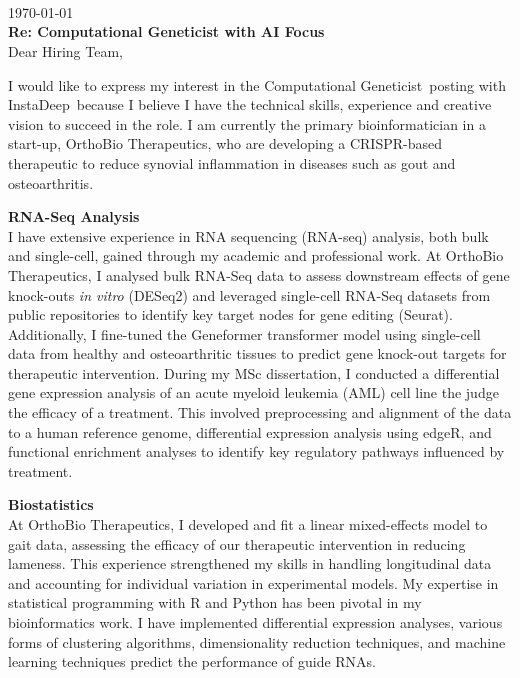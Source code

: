 \documentclass{resume}
\newcommand\JOB{Computational Geneticist with AI Focus
}
\newcommand\POSTING{Computational Geneticist}
\newcommand\COMPANY{InstaDeep}
\newcommand\EMPLOYER{Hiring Team}
\newcommand\REF{}
\begin{document}
\begin{rSection}{}
\leavevmode \\ \\ \\
\today \\
\REF
\textbf{Re: \JOB}  \\ 

Dear \EMPLOYER ,

I would like to express my interest in the \POSTING\ posting with \COMPANY\ because I believe I have the technical skills, experience and creative vision to succeed in the role. I am currently the primary bioinformatician in a start-up, OrthoBio Therapeutics, who are developing a CRISPR-based therapeutic to reduce synovial inflammation in diseases such as gout and osteoarthritis. 

\textbf{RNA-Seq Analysis} \\
I have extensive experience in RNA sequencing (RNA-seq) analysis, both bulk and single-cell, gained through my academic and professional work. At OrthoBio Therapeutics, I analysed bulk RNA-Seq data to assess downstream effects of gene knock-outs \textit{in vitro} (DESeq2) and leveraged single-cell RNA-Seq datasets from public repositories to identify key target nodes for gene editing (Seurat). Additionally, I fine-tuned the Geneformer transformer model using single-cell data from healthy and osteoarthritic tissues to predict gene knock-out targets for therapeutic intervention. During my MSc dissertation, I conducted a differential gene expression analysis of an acute myeloid leukemia (AML) cell line the judge the efficacy of a treatment. This involved preprocessing and alignment of the data to a human reference genome, differential expression analysis using edgeR, and functional enrichment analyses to identify key regulatory pathways influenced by treatment. 

\textbf{Biostatistics} \\
At OrthoBio Therapeutics, I developed and fit a linear mixed-effects model to gait data, assessing the efficacy of our therapeutic intervention in reducing lameness. This experience strengthened my skills in handling longitudinal data and accounting for individual variation in experimental models. My expertise in statistical programming with R and Python has been pivotal in my bioinformatics work. I have implemented differential expression analyses, various forms of clustering algorithms, dimensionality reduction techniques, and  machine learning techniques predict the performance of guide RNAs.


\end{rSection}
\end{document}
